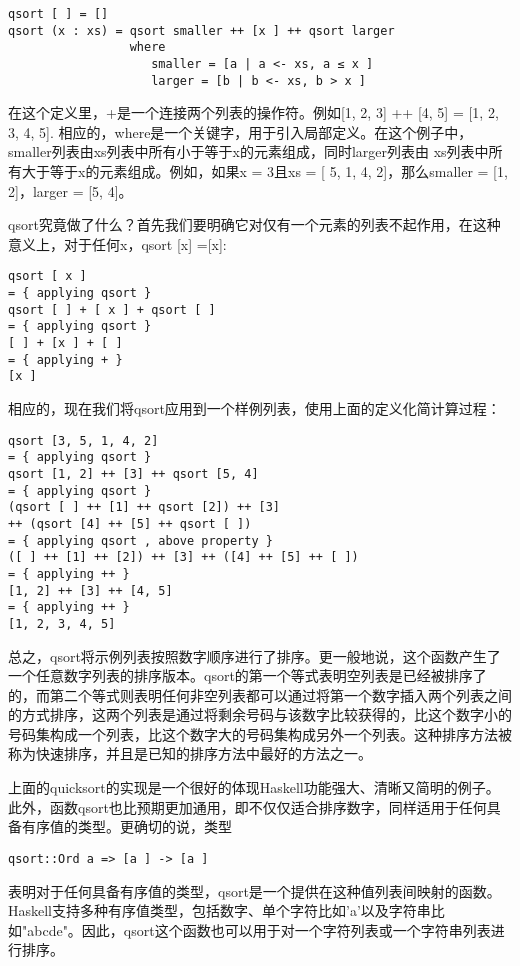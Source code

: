 \begin{verbatim}
qsort [ ] = []
qsort (x : xs) = qsort smaller ++ [x ] ++ qsort larger
                 where
                    smaller = [a | a <- xs, a ≤ x ]
                    larger = [b | b <- xs, b > x ]
\end{verbatim}

在这个定义里，+是一个连接两个列表的操作符。例如[1, 2, 3] ++ [4, 5] = [1, 2, 3, 4, 5].  相应的，where是一个关键字，用于引入局部定义。在这个例子中，smaller列表由xs列表中所有小于等于x的元素组成，同时larger列表由 xs列表中所有大于等于x的元素组成。例如，如果x = 3且xs = [ 5, 1, 4, 2]，那么smaller = [1, 2]，larger = [5, 4]。

qsort究竟做了什么？首先我们要明确它对仅有一个元素的列表不起作用，在这种意义上，对于任何x，qsort [x] =[x]:

\begin{verbatim}
qsort [ x ]
= { applying qsort }
qsort [ ] + [ x ] + qsort [ ]
= { applying qsort }
[ ] + [x ] + [ ]
= { applying + }
[x ]
\end{verbatim}

相应的，现在我们将qsort应用到一个样例列表，使用上面的定义化简计算过程：

\begin{verbatim}
qsort [3, 5, 1, 4, 2]
= { applying qsort }
qsort [1, 2] ++ [3] ++ qsort [5, 4]
= { applying qsort }
(qsort [ ] ++ [1] ++ qsort [2]) ++ [3]
++ (qsort [4] ++ [5] ++ qsort [ ])
= { applying qsort , above property }
([ ] ++ [1] ++ [2]) ++ [3] ++ ([4] ++ [5] ++ [ ])
= { applying ++ }
[1, 2] ++ [3] ++ [4, 5]
= { applying ++ }
[1, 2, 3, 4, 5]
\end{verbatim}

总之，qsort将示例列表按照数字顺序进行了排序。更一般地说，这个函数产生了一个任意数字列表的排序版本。qsort的第一个等式表明空列表是已经被排序了的，而第二个等式则表明任何非空列表都可以通过将第一个数字插入两个列表之间的方式排序，这两个列表是通过将剩余号码与该数字比较获得的，比这个数字小的号码集构成一个列表，比这个数字大的号码集构成另外一个列表。这种排序方法被称为快速排序，并且是已知的排序方法中最好的方法之一。

上面的quicksort的实现是一个很好的体现Haskell功能强大、清晰又简明的例子。此外，函数qsort也比预期更加通用，即不仅仅适合排序数字，同样适用于任何具备有序值的类型。更确切的说，类型

\begin{verbatim}
qsort::Ord a => [a ] -> [a ]
\end{verbatim}

表明对于任何具备有序值的类型，qsort是一个提供在这种值列表间映射的函数。Haskell支持多种有序值类型，包括数字、单个字符比如'a'以及字符串比如"abcde"。因此，qsort这个函数也可以用于对一个字符列表或一个字符串列表进行排序。

